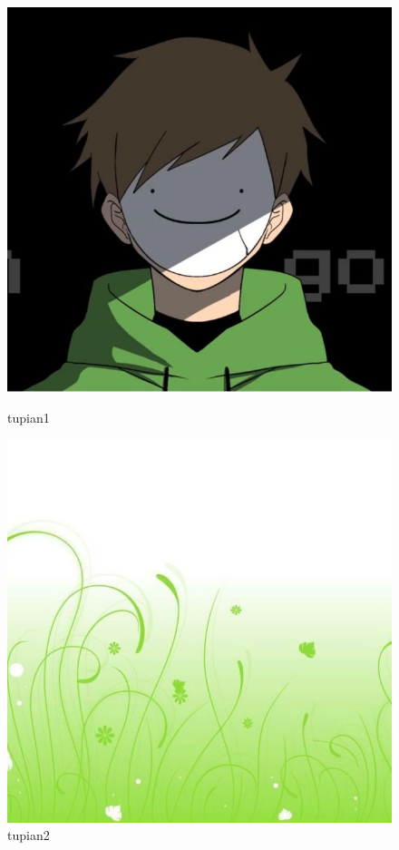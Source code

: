 \documentclass[a4paper]{article}  %
\begin{document}
\begin{figure}[htbp]
	\centering
	\begin{minipage}{0.49\linewidth}
		\centering
		\includegraphics[width=0.9\linewidth]{contents/rsa2.jpg}
		\caption{tupian1}
		\label{tupian1}%
	\end{minipage}
	\begin{minipage}{0.49\linewidth}
		\centering
		\includegraphics[width=0.9\linewidth]{contents/rsa3.jpg}
		\caption{tupian2}
		\label{tupian2}%
	\end{minipage}
	

\end{figure}
\end{document}
